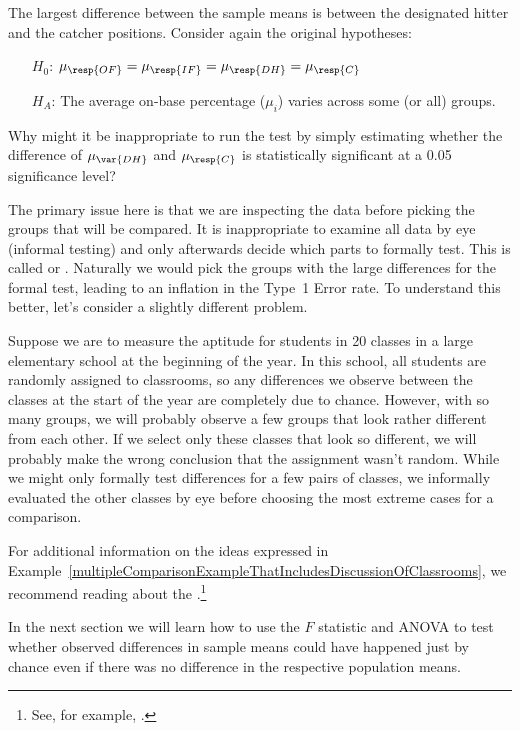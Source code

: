 \begin{example}{The largest difference between the sample means is between the designated hitter and the catcher positions. Consider again the original hypotheses:
\begin{itemize}
\setlength{\itemsep}{0mm}
\item[$H_0$:] $\mu_{\resp{OF}} = \mu_{\resp{IF}} = \mu_{\resp{DH}} = \mu_{\resp{C}}$
\item[$H_A$:] The average on-base percentage ($\mu_i$) varies across some (or all) groups.
\end{itemize}
Why might it be inappropriate to run the test by simply estimating whether the difference of $\mu_{\var{DH}}$ and $\mu_{\resp{C}}$ is statistically significant at a 0.05 significance level?}
\label{multipleComparisonExampleThatIncludesDiscussionOfClassrooms}
The primary issue here is that we are inspecting the data before picking the groups that will be compared. It is inappropriate to examine all data by eye (informal testing) and only afterwards decide which parts to formally test. This is called  or . Naturally we would pick the groups with the large differences for the formal test, leading to an inflation in the Type~1 Error rate. To understand this better, let's consider a slightly different problem.

Suppose we are to measure the aptitude for students in 20 classes in a large elementary school at the beginning of the year. In this school, all students are randomly assigned to classrooms, so any differences we observe between the classes at the start of the year are completely due to chance. However, with so many groups, we will probably observe a few groups that look rather different from each other. If we select only these classes that look so different, we will probably make the wrong conclusion that the assignment wasn't random. While we might only formally test differences for a few pairs of classes, we informally evaluated the other classes by eye before choosing the most extreme cases for a comparison.
\end{example}

For additional information on the ideas expressed in Example~\ref{multipleComparisonExampleThatIncludesDiscussionOfClassrooms}, we recommend reading about the .\footnote{See, for example, .}

In the next section we will learn how to use the $F$ statistic and ANOVA to test whether observed differences in sample means could have happened just by chance even if there was no difference in the respective population means.


